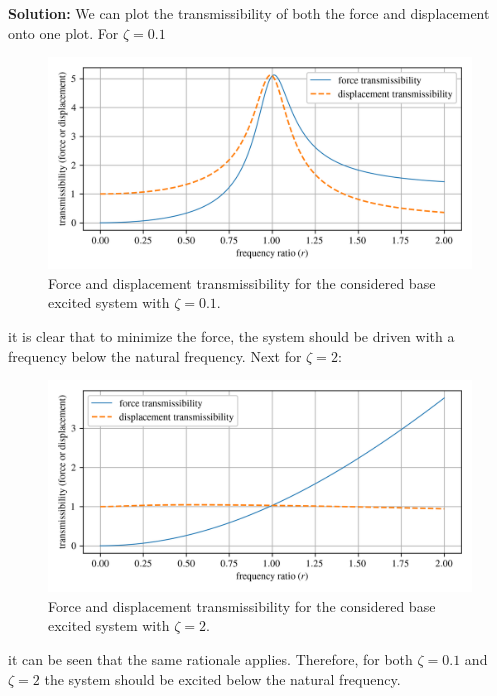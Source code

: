 \documentclass[12pt,letter]{article}
\begin{document}
\begin{example}
			\noindent\textbf{Solution:} We can plot the transmissibility of both the force and displacement onto one plot. For $\zeta=0.1$
			\begin{figure}[H]
				\centering
				\includegraphics[]{../figures/base_excitation_force_and_displacement_transmissibility_1.png}
				\caption{Force and displacement transmissibility for the considered base excited system with $\zeta=0.1$.}
			\end{figure}
			\noindent it is clear that to minimize the force, the system should be driven with a frequency below the natural frequency. Next for  $\zeta=2$:
			\begin{figure}[H]
				\centering
				\includegraphics[]{../figures/base_excitation_force_and_displacement_transmissibility_2.png}
				\caption{Force and displacement transmissibility for the considered base excited system with $\zeta=2$.}
			\end{figure}
			\noindent it can be seen that the same rationale applies. Therefore, for both $\zeta=0.1$ and $\zeta=2$ the system should be excited below the natural frequency.
		
		\end{example}

		
					
\end{document}
